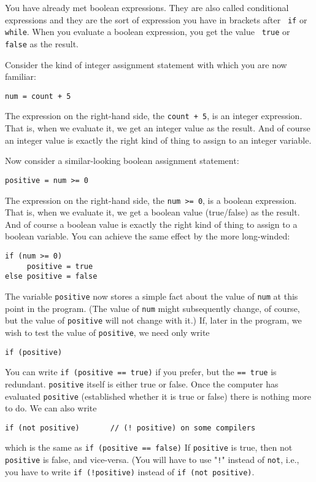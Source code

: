 You have already met boolean expressions.  They are also called conditional
expressions and they are the sort of expression you have in brackets
after \texttt{ if} or \texttt{while}.  When you evaluate a boolean expression,
you get the value \texttt{ true} or \texttt{false} as the result.

Consider the kind of integer assignment statement with which you are now familiar:
\begin{Verbatim}
num = count + 5
\end{Verbatim}
The expression on the right-hand side, the \texttt{count + 5}, is an
integer expression.  That is, when we evaluate it, we get an integer value
as the result.  And of course an integer value is exactly the right kind of
thing to assign to an integer variable.

Now consider a similar-looking boolean assignment statement:
\begin{Verbatim}
positive = num >= 0
\end{Verbatim}
The expression on the right-hand side, the \texttt{num >= 0}, is a
boolean expression.  That is, when we evaluate it, we get a boolean value
(true/false) as the result.  And of course a boolean value is exactly the
right kind of thing to assign to a boolean variable.  You can achieve
the same effect by the more long-winded:
\begin{Verbatim}
if (num >= 0)
     positive = true
else positive = false
\end{Verbatim}
The variable \texttt{positive} now stores a simple fact about the value of
 \texttt{num} at this point in the program.  (The value of  \texttt{num} might
subsequently change, of course, but the value of \texttt{positive} will not
change with it.)  If, later in the program, we wish to test
the value of \texttt{positive}, we need only write
\begin{Verbatim}
if (positive)
\end{Verbatim}
You can write \texttt{if (positive == true)} if you prefer, but the \texttt{== true}
is redundant.  \texttt{positive} itself is either true or false.  Once the
computer has evaluated \texttt{positive} (established whether it is true or
false) there is nothing more to do.  We can also write
\begin{Verbatim}
if (not positive)       // (! positive) on some compilers
\end{Verbatim}
which is the same as \texttt{if (positive == false)}  If \texttt{positive} is
true, then not \texttt{positive} is false, and vice-versa.  (You will have to use "\texttt{!}" instead of \texttt{not}, i.e., you have
to write \texttt{if (!positive)} instead of \texttt{if (not positive)}.

